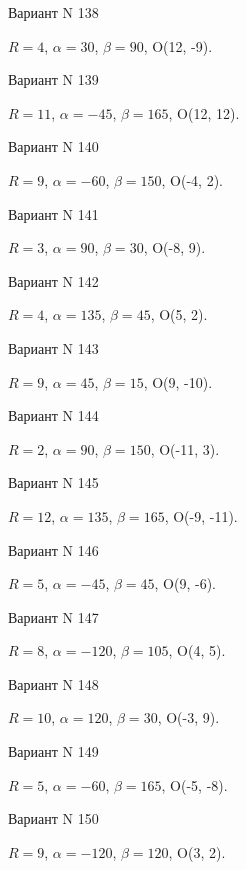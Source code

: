 \documentclass[11pt]{report}
\begin{document}
Вариант N 138

$R = 4$, $\alpha = 30$, $\beta = 90$, O(12, -9).



Вариант N 139

$R = 11$, $\alpha = -45$, $\beta = 165$, O(12, 12).



Вариант N 140

$R = 9$, $\alpha = -60$, $\beta = 150$, O(-4, 2).



Вариант N 141

$R = 3$, $\alpha = 90$, $\beta = 30$, O(-8, 9).



Вариант N 142

$R = 4$, $\alpha = 135$, $\beta = 45$, O(5, 2).



Вариант N 143

$R = 9$, $\alpha = 45$, $\beta = 15$, O(9, -10).



Вариант N 144

$R = 2$, $\alpha = 90$, $\beta = 150$, O(-11, 3).



Вариант N 145

$R = 12$, $\alpha = 135$, $\beta = 165$, O(-9, -11).



Вариант N 146

$R = 5$, $\alpha = -45$, $\beta = 45$, O(9, -6).



Вариант N 147

$R = 8$, $\alpha = -120$, $\beta = 105$, O(4, 5).



Вариант N 148

$R = 10$, $\alpha = 120$, $\beta = 30$, O(-3, 9).



Вариант N 149

$R = 5$, $\alpha = -60$, $\beta = 165$, O(-5, -8).



Вариант N 150

$R = 9$, $\alpha = -120$, $\beta = 120$, O(3, 2).
\end{document}
